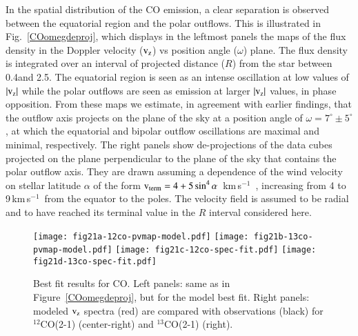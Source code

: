 \documentclass{aa}
\newcommand{\kms}{\,km\,s$^{-1}$~}
\begin{document}
In the spatial distribution of the CO emission, a clear separation is
observed between the equatorial region and the polar outflows. This is
illustrated in Fig.~\ref{COomegdeproj}, which displays in the leftmost
panels the maps of the flux density in the Doppler velocity (${\rm
v_z}$) vs position angle ($\omega$) plane. The flux density is
integrated over an interval of projected distance ($R$) from the star
between 0.4\arcsec and 2.5\arcsec. The equatorial region is seen as an
intense oscillation at low values of $|{\rm v_z}|$ while the  polar
outflows are seen as emission at larger $|{\rm v_z}|$ values, in phase
opposition. From these maps we estimate, in agreement with earlier
findings, that the outflow axis projects on the plane of the sky at a
position angle of $\omega = 7^{\circ}\pm5^{\circ}$, at which the
equatorial and bipolar outflow oscillations are maximal and minimal,
respectively. The right panels show de-projections of the data cubes
projected on the plane perpendicular to the plane of the sky that
contains the polar outflow axis. They are drawn assuming a dependence
of the wind velocity on stellar latitude $\alpha$ of the form ${\rm
v_{term}} = 4 + 5\sin^4\alpha$ \kms, increasing from 4 to 9\kms from
the equator to the poles. The velocity field is assumed to be radial
and to have reached its terminal value in the $R$ interval considered
here.

\begin{figure*}
  \centering
  \texttt{[image: fig21a-12co-pvmap-model.pdf]}
  \texttt{[image: fig21b-13co-pvmap-model.pdf]}
  \texttt{[image: fig21c-12co-spec-fit.pdf]}
  \texttt{[image: fig21d-13co-spec-fit.pdf]}
  \caption{Best fit results for CO. Left panels: same as in
      Figure~\ref{COomegdeproj}, but for the model best fit. Right
      panels: modeled ${\rm v_z}$ spectra (red) are compared with
      observations (black) for $^{12}$CO(2-1) (center-right) and
      $^{13}$CO(2-1) (right).}
  \label{COmodelfig}
\end{figure*}
\end{document}
